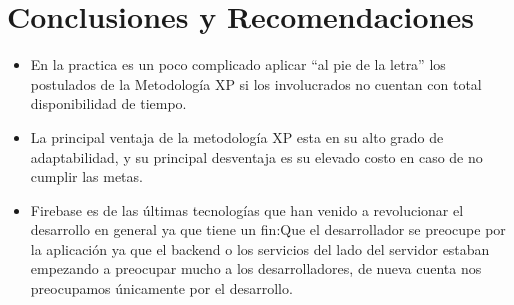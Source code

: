 \documentclass[preprint,12pt]{elsarticle}
\begin{document}
\section{Conclusiones y Recomendaciones }
\begin{itemize}
\item En la practica es un poco complicado aplicar “al pie de la letra” los postulados de la Metodología XP si los involucrados no cuentan con total disponibilidad de tiempo.
\item La principal ventaja de la metodología XP esta en su alto grado de adaptabilidad, y su principal desventaja es su elevado costo en caso de no cumplir las metas.
\item Firebase es de las últimas tecnologías que han venido a revolucionar el desarrollo en general ya que tiene un fin:Que el desarrollador se preocupe por la aplicación ya que el backend o los servicios del lado del servidor estaban empezando a preocupar mucho a los desarrolladores, de nueva cuenta nos preocupamos únicamente por el desarrollo.
\end{itemize}



	
	\newpage
	


	
\end{document}
